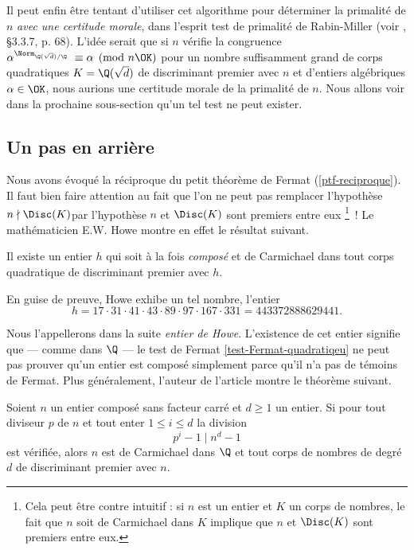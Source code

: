 Il peut enfin être tentant d'utiliser cet algorithme pour déterminer la primalité de $n$ \emph{avec une certitude morale}, dans l'esprit test de primalité de Rabin-Miller (voir \cite{Demazure}, §3.3.7, p. 68). L'idée serait que si $n$ vérifie la congruence $\alpha^{\Norm_{\Q(\sqrt{d})/\Q}} \equiv \alpha \pmod{n\OK}$ pour un nombre suffisamment grand de corps quadratiques $K = \Q(\sqrt{d})$ de discriminant premier avec $n$ et d'entiers algébriques $\alpha \in \OK$, nous aurions une certitude morale de la primalité de $n$. Nous allons voir dans la prochaine sous-section qu'un tel test ne peut exister.

\subsection{Un pas en arrière}

Nous avons évoqué la réciproque du petit théorème de Fermat (\ref{ptf-reciproque}). Il faut bien faire attention au fait que l'on ne peut pas remplacer l'hypothèse \og $n \nmid \Disc(K)$\fg par l'hypothèse \og $n$ et $\Disc(K)$ sont premiers entre eux \fg \footnote{Cela peut être contre intuitif : si $n$ est un entier et $K$ un corps de nombres, le fait que $n$ soit de Carmichael dans $K$ implique que $n$ et $\Disc(K)$ sont premiers entre eux.}~! Le mathématicien E.W. Howe montre en effet le résultat suivant.

\begin{theoreme}[Howe, 200]
	Il existe un entier $h$ qui soit à la fois \emph{composé} et de Carmichael dans tout corps quadratique de discriminant premier avec $h$.
\end{theoreme}

En guise de preuve, Howe exhibe un tel nombre, l'entier 
	\begin{equation}\label{Howe}
		h = 17 \cdot 31 \cdot 41 \cdot 43 \cdot 89 \cdot 97 \cdot 167 \cdot 331 = 443372888629441.
	\end{equation}

Nous l'appellerons dans la suite \emph{entier de Howe}. L'existence de cet entier signifie que — comme dans $\Q$ — le test de Fermat \ref{test-Fermat-quadratiqeu} ne peut pas prouver qu'un entier est composé simplement parce qu'il n'a pas de témoins de Fermat. Plus généralement, l'auteur de l'article montre le théorème suivant.

\begin{theoreme}\label{theoreme-2.7}
	Soient $n$ un entier composé sans facteur carré et $d\geq 1$ un entier. Si pour tout diviseur $p$ de $n$ et tout enter $1\leq i \leq d$ la division $$p^i - 1\mid n^d - 1$$ est vérifiée, alors $n$ est de Carmichael dans $\Q$ et tout corps de nombres de degré $d$ de discriminant premier avec $n$.
\end{theoreme}

